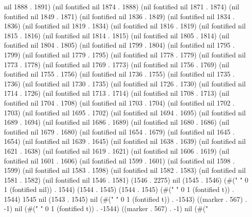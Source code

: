 nil 1888 . 1891) (nil fontified nil 1874 . 1888) (nil fontified nil 1871 . 1874) (nil fontified nil 1849 . 1871) (nil fontified nil 1836 . 1849) (nil fontified nil 1834 . 1836) (nil fontified nil 1819 . 1834) (nil fontified nil 1816 . 1819) (nil fontified nil 1815 . 1816) (nil fontified nil 1814 . 1815) (nil fontified nil 1805 . 1814) (nil fontified nil 1804 . 1805) (nil fontified nil 1799 . 1804) (nil fontified nil 1795 . 1799) (nil fontified nil 1779 . 1795) (nil fontified nil 1778 . 1779) (nil fontified nil 1773 . 1778) (nil fontified nil 1769 . 1773) (nil fontified nil 1756 . 1769) (nil fontified nil 1755 . 1756) (nil fontified nil 1736 . 1755) (nil fontified nil 1735 . 1736) (nil fontified nil 1730 . 1735) (nil fontified nil 1726 . 1730) (nil fontified nil 1714 . 1726) (nil fontified nil 1713 . 1714) (nil fontified nil 1708 . 1713) (nil fontified nil 1704 . 1708) (nil fontified nil 1703 . 1704) (nil fontified nil 1702 . 1703) (nil fontified nil 1695 . 1702) (nil fontified nil 1694 . 1695) (nil fontified nil 1689 . 1694) (nil fontified nil 1686 . 1689) (nil fontified nil 1680 . 1686) (nil fontified nil 1679 . 1680) (nil fontified nil 1654 . 1679) (nil fontified nil 1645 . 1654) (nil fontified nil 1639 . 1645) (nil fontified nil 1638 . 1639) (nil fontified nil 1621 . 1638) (nil fontified nil 1619 . 1621) (nil fontified nil 1606 . 1619) (nil fontified nil 1601 . 1606) (nil fontified nil 1599 . 1601) (nil fontified nil 1598 . 1599) (nil fontified nil 1583 . 1598) (nil fontified nil 1582 . 1583) (nil fontified nil 1581 . 1582) (nil fontified nil 1546 . 1581) (1546 . 2275) nil (1545 . 1546) (#(" " 0 1 (fontified nil)) . 1544) (1544 . 1545) (1544 . 1545) (#(" " 0 1 (fontified t)) . 1544) 1545 nil (1543 . 1545) nil (#("
" 0 1 (fontified t)) . -1543) ((marker . 567) . -1) nil (#("
" 0 1 (fontified t)) . -1544) ((marker . 567) . -1) nil (#("
